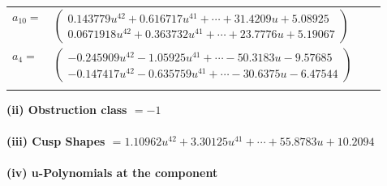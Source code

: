\documentclass[1p]{elsarticle_modified}
\theoremstyle{definition}
\begin{document}
\begin{tabular}{m{7pt} m{180pt} m{7pt} m{180pt} }
\flushright $a_{10}=$&$\begin{pmatrix}0.143779 u^{42}+0.616717 u^{41}+\cdots+31.4209 u+5.08925\\0.0671918 u^{42}+0.363732 u^{41}+\cdots+23.7776 u+5.19067\end{pmatrix}$ \\
\flushright $a_{4}=$&$\begin{pmatrix}-0.245909 u^{42}-1.05925 u^{41}+\cdots-50.3183 u-9.57685\\-0.147417 u^{42}-0.635759 u^{41}+\cdots-30.6375 u-6.47544\end{pmatrix}$\\&\end{tabular}
\flushleft \textbf{(ii) Obstruction class $= -1$}\\~\\
\flushleft \textbf{(iii) Cusp Shapes $= 1.10962 u^{42}+3.30125 u^{41}+\cdots+55.8783 u+10.2094$}\\~\\
\newpage\renewcommand{\arraystretch}{1}
\flushleft \textbf{(iv) u-Polynomials at the component}\newline \\
\end{document}
